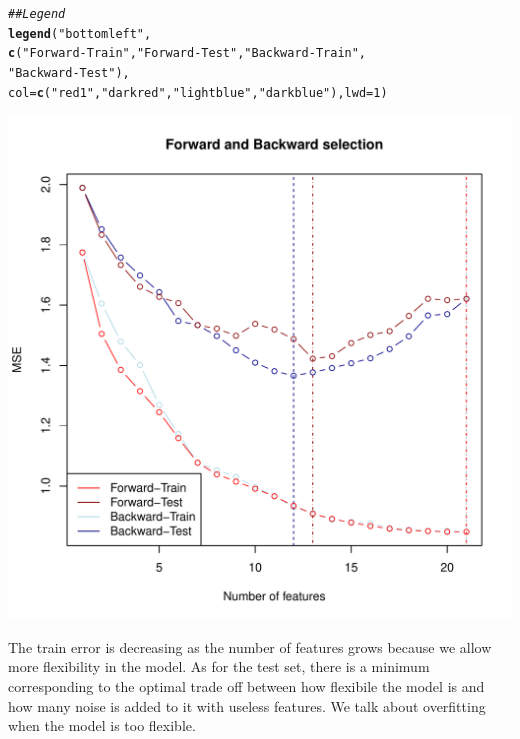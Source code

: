 \documentclass[11pt]{article}\usepackage[]{graphicx}\usepackage[]{color}
\makeatletter
\def\maxwidth{ %
  \ifdim\Gin@nat@width>\linewidth
    \linewidth
  \else
    \Gin@nat@width
  \fi
}
\newcommand{\hlnum}[1]{\textcolor[rgb]{0.686,0.059,0.569}{#1}}%
\newcommand{\hlstr}[1]{\textcolor[rgb]{0.192,0.494,0.8}{#1}}%
\newcommand{\hlcom}[1]{\textcolor[rgb]{0.678,0.584,0.686}{\textit{#1}}}%
\newcommand{\hlstd}[1]{\textcolor[rgb]{0.345,0.345,0.345}{#1}}%
\newcommand{\hlkwc}[1]{\textcolor[rgb]{0.333,0.667,0.333}{#1}}%
\newcommand{\hlkwd}[1]{\textcolor[rgb]{0.737,0.353,0.396}{\textbf{#1}}}%
\newenvironment{kframe}{%
 \def\at@end@of@kframe{}%
 \ifinner\ifhmode%
  \def\at@end@of@kframe{\end{minipage}}%
  \begin{minipage}{\columnwidth}%
 \fi\fi%
 \def\FrameCommand##1{\hskip\@totalleftmargin \hskip-\fboxsep
 \colorbox{shadecolor}{##1}\hskip-\fboxsep
     \hskip-\linewidth \hskip-\@totalleftmargin \hskip\columnwidth}%
 \MakeFramed {\advance\hsize-\width
   \@totalleftmargin\z@ \linewidth\hsize
   \@setminipage}}%
 {\par\unskip\endMakeFramed%
 \at@end@of@kframe}
\newenvironment{knitrout}{}{} %
\makeatother
\begin{document}
\begin{knitrout}
\begin{kframe}
\begin{alltt}
\hlcom{## Legend}
\hlkwd{legend}\hlstd{(}\hlstr{"bottomleft"}\hlstd{,}
       \hlkwd{c}\hlstd{(}\hlstr{"Forward-Train"}\hlstd{,}\hlstr{"Forward-Test"}\hlstd{,}\hlstr{"Backward-Train"}\hlstd{,}
         \hlstr{"Backward-Test"}\hlstd{),}
       \hlkwc{col} \hlstd{=} \hlkwd{c}\hlstd{(}\hlstr{"red1"}\hlstd{,}\hlstr{"darkred"}\hlstd{,}\hlstr{"lightblue"}\hlstd{,}\hlstr{"darkblue"}\hlstd{),}\hlkwc{lwd}\hlstd{=}\hlnum{1}\hlstd{)}
\end{alltt}
\end{kframe}
\includegraphics[width=\maxwidth]{figure/unnamed-chunk-5-1} 

\end{knitrout}
The train error is decreasing as the number of features grows because we allow more flexibility in the model. As for the test set, there is a minimum corresponding to the optimal trade off between how flexibile the model is and how many noise is added to it with useless features. We talk about overfitting when the model is too flexible.
\end{document}
